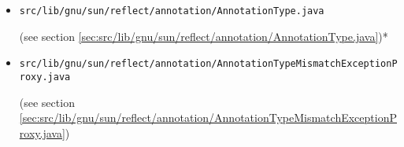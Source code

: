 \documentclass[a4paper, 10pt, titlepage]{scrartcl} %
\begin{document}
\begin{itemize}
 \item \begin{scriptsize}\verb|src|\hspace{0.0pt}\verb|/|\hspace{0.0pt}\verb|lib|\hspace{0.0pt}\verb|/|\hspace{0.0pt}\verb|gnu|\hspace{0.0pt}\verb|/|\hspace{0.0pt}\verb|sun|\hspace{0.0pt}\verb|/|\hspace{0.0pt}\verb|reflect|\hspace{0.0pt}\verb|/|\hspace{0.0pt}\verb|annotation|\hspace{0.0pt}\verb|/|\hspace{0.0pt}\verb|AnnotationType|\hspace{0.0pt}\verb|.|\hspace{0.0pt}\verb|java|\end{scriptsize} (see section \ref{sec:src/lib/gnu/sun/reflect/annotation/AnnotationType.java})*
 \item \begin{scriptsize}\verb|src|\hspace{0.0pt}\verb|/|\hspace{0.0pt}\verb|lib|\hspace{0.0pt}\verb|/|\hspace{0.0pt}\verb|gnu|\hspace{0.0pt}\verb|/|\hspace{0.0pt}\verb|sun|\hspace{0.0pt}\verb|/|\hspace{0.0pt}\verb|reflect|\hspace{0.0pt}\verb|/|\hspace{0.0pt}\verb|annotation|\hspace{0.0pt}\verb|/|\hspace{0.0pt}\verb|AnnotationTypeMismatchExceptionProxy|\hspace{0.0pt}\verb|.|\hspace{0.0pt}\verb|java|\end{scriptsize} (see section \ref{sec:src/lib/gnu/sun/reflect/annotation/AnnotationTypeMismatchExceptionProxy.java})

\end{itemize}
\end{document}
